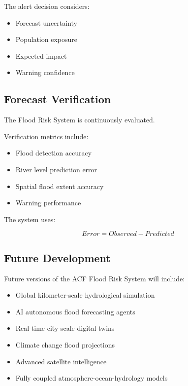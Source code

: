 The alert decision considers:

\begin{itemize}

\item Forecast uncertainty

\item Population exposure

\item Expected impact

\item Warning confidence

\end{itemize}



\subsection{Forecast Verification}

The Flood Risk System is continuously evaluated.

Verification metrics include:

\begin{itemize}

\item Flood detection accuracy

\item River level prediction error

\item Spatial flood extent accuracy

\item Warning performance

\end{itemize}


The system uses:

\[
Error =
Observed
-
Predicted
\]



\subsection{Future Development}

Future versions of the ACF Flood Risk System will include:

\begin{itemize}

\item Global kilometer-scale hydrological simulation

\item AI autonomous flood forecasting agents

\item Real-time city-scale digital twins

\item Climate change flood projections

\item Advanced satellite intelligence

\item Fully coupled atmosphere-ocean-hydrology models

\end{itemize}


